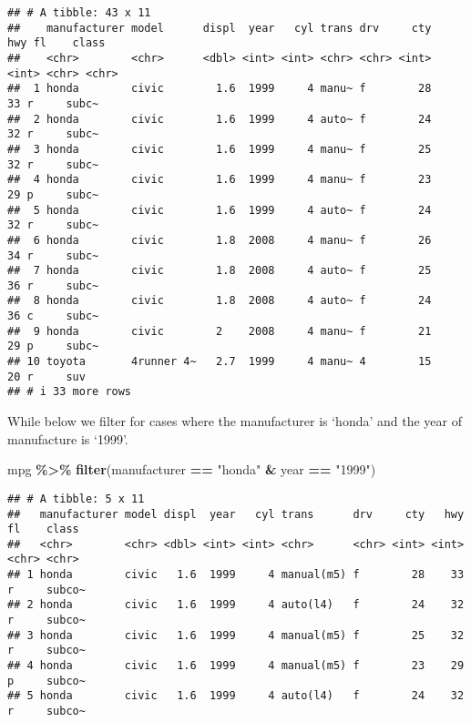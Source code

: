 \documentclass[
]{book}
\newenvironment{Shaded}{\begin{snugshade}}{\end{snugshade}}
\newcommand{\FunctionTok}[1]{\textcolor[rgb]{0.13,0.29,0.53}{\textbf{#1}}}
\newcommand{\NormalTok}[1]{#1}
\newcommand{\SpecialCharTok}[1]{\textcolor[rgb]{0.81,0.36,0.00}{\textbf{#1}}}
\newcommand{\StringTok}[1]{\textcolor[rgb]{0.31,0.60,0.02}{#1}}
\begin{document}
\begin{verbatim}
## # A tibble: 43 x 11
##    manufacturer model      displ  year   cyl trans drv     cty   hwy fl    class
##    <chr>        <chr>      <dbl> <int> <int> <chr> <chr> <int> <int> <chr> <chr>
##  1 honda        civic        1.6  1999     4 manu~ f        28    33 r     subc~
##  2 honda        civic        1.6  1999     4 auto~ f        24    32 r     subc~
##  3 honda        civic        1.6  1999     4 manu~ f        25    32 r     subc~
##  4 honda        civic        1.6  1999     4 manu~ f        23    29 p     subc~
##  5 honda        civic        1.6  1999     4 auto~ f        24    32 r     subc~
##  6 honda        civic        1.8  2008     4 manu~ f        26    34 r     subc~
##  7 honda        civic        1.8  2008     4 auto~ f        25    36 r     subc~
##  8 honda        civic        1.8  2008     4 auto~ f        24    36 c     subc~
##  9 honda        civic        2    2008     4 manu~ f        21    29 p     subc~
## 10 toyota       4runner 4~   2.7  1999     4 manu~ 4        15    20 r     suv  
## # i 33 more rows
\end{verbatim}

While below we filter for cases where the manufacturer is `honda' and the year of manufacture is `1999'.

\begin{Shaded}
\begin{Highlighting}[]
\NormalTok{mpg }\SpecialCharTok{\%\textgreater{}\%} 
  \FunctionTok{filter}\NormalTok{(manufacturer }\SpecialCharTok{==} \StringTok{"honda"} \SpecialCharTok{\&}\NormalTok{ year }\SpecialCharTok{==} \StringTok{"1999"}\NormalTok{)}
\end{Highlighting}
\end{Shaded}

\begin{verbatim}
## # A tibble: 5 x 11
##   manufacturer model displ  year   cyl trans      drv     cty   hwy fl    class 
##   <chr>        <chr> <dbl> <int> <int> <chr>      <chr> <int> <int> <chr> <chr> 
## 1 honda        civic   1.6  1999     4 manual(m5) f        28    33 r     subco~
## 2 honda        civic   1.6  1999     4 auto(l4)   f        24    32 r     subco~
## 3 honda        civic   1.6  1999     4 manual(m5) f        25    32 r     subco~
## 4 honda        civic   1.6  1999     4 manual(m5) f        23    29 p     subco~
## 5 honda        civic   1.6  1999     4 auto(l4)   f        24    32 r     subco~
\end{verbatim}
\end{document}
